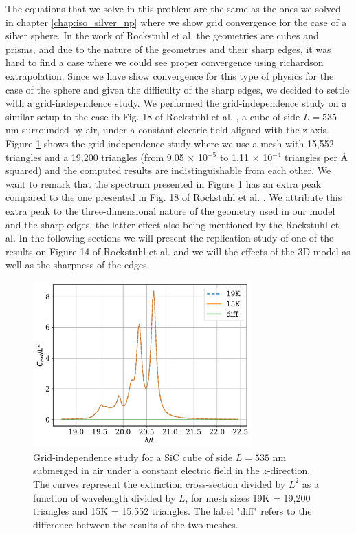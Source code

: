The equations that we solve in this problem are the same as the ones we solved in chapter \ref{chap:iso_silver_np} where we show grid convergence for the case of 
a silver sphere. In the work of Rockstuhl et al. \cite{rockstuhl2005} the geometries are cubes and prisms, and due to the nature of the geometries 
and their sharp edges, it was hard to find a case where we could see proper convergence using richardson extrapolation. Since we have show convergence for this type of physics
for the case of the sphere and given the difficulty of the sharp edges, we decided to settle with a grid-independence study. We performed the grid-independence study
on a similar setup to the case ib Fig. 18 of Rockstuhl et al. \cite{rockstuhl2005}, a cube of side $L=535$ nm surrounded by air, under a constant electric field aligned with the 
z-axis. Figure \ref{fig:cube535} shows the grid-independence study where we use a mesh with 15,552 triangles and a 19,200 triangles 
(from 9.05 $\times$ 10$^{-5}$ to 1.11 $\times$ 10$^{-4}$ triangles per $\text{\AA}$ squared) and the computed results are indistinguishable from each other.
We want to remark that the spectrum presented in Figure \ref{fig:cube535} has an extra peak compared to the one presented in Fig. 18 of Rockstuhl et al. \cite{rockstuhl2005}. We attribute
this extra peak to the three-dimensional nature of the geometry used in our model and the sharp edges, the latter effect also being mentioned by the Rockstuhl et al.
In the following sections we will present the replication study of one of the results on Figure 14 of Rockstuhl et al. and we will the effects of the 3D model as well as the sharpness of the edges. 

\begin{figure}
    \centering
    \includegraphics[width=0.75\textwidth]{cubeL535nm_15Kvs19K.pdf} 
    \caption{Grid-independence study for a SiC cube of side $L=535$ nm submerged in air under a constant 
    electric field in the $z$-direction. The curves represent the extinction cross-section divided by $L^2$ 
    as a function of wavelength divided by $L$, for mesh sizes 19K = 19,200 triangles and 15K = 15,552 triangles. 
    The label "diff" refers to the difference between the results of the two meshes.}
    \label{fig:cube535}
 \end{figure}

